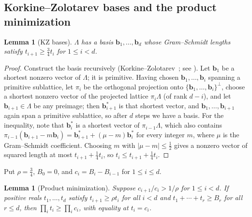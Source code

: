 \documentclass[11pt]{article}
\newtheorem{lemma}[theorem]{Lemma}
\theoremstyle{definition}
\theoremstyle{remark}
\newcommand{\vct}[1]{\mathbf{#1}}
\begin{document}
\subsection{Korkine--Zolotarev bases and the product minimization}

\begin{lemma}[KZ bases]\label{lem:kz}
$\Lambda$ has a basis $\vct{b}_1,\ldots,\vct{b}_d$ whose Gram--Schmidt
lengths satisfy $t_{i+1}\geq\frac34t_i$ for $1\leq i<d$.
\end{lemma}

\begin{proof}
Construct the basis recursively (Korkine--Zolotarev~\cite{KZ1873}; see
\cite{LLS90}).  Let $\vct{b}_1$ be a shortest nonzero vector of $\Lambda$;
it is primitive.  Having chosen $\vct{b}_1,\ldots,\vct{b}_i$ spanning a
primitive sublattice, let $\pi_i$ be the orthogonal projection onto
$\{\vct{b}_1,\ldots,\vct{b}_i\}^{\perp}$, choose a shortest nonzero vector
of the projected lattice $\pi_i\Lambda$ (of rank $d-i$), and let
$\vct{b}_{i+1}\in\Lambda$ be any preimage; then $\vct{b}_{i+1}^{*}$ is that
shortest vector, and $\vct{b}_1,\ldots,\vct{b}_{i+1}$ again span a
primitive sublattice, so after $d$ steps we have a basis.  For the
inequality, note that $\vct{b}_i^{*}$ is a shortest vector of
$\pi_{i-1}\Lambda$, which also contains
$\pi_{i-1}(\vct{b}_{i+1}-m\vct{b}_i)=\vct{b}_{i+1}^{*}+(\mu-m)\vct{b}_i^{*}$
for every integer $m$, where $\mu$ is the Gram--Schmidt coefficient.
Choosing $m$ with $|\mu-m|\leq\frac12$ gives a nonzero vector of squared
length at most $t_{i+1}+\frac14t_i$, so $t_i\leq t_{i+1}+\frac14t_i$.
\end{proof}

Put $\rho=\frac34$, $B_0=0$, and $c_i=B_i-B_{i-1}$ for $1\leq i\leq d$.

\begin{lemma}[Product minimization]\label{lem:minimize}
Suppose $c_{i+1}/c_i>1/\rho$ for $1\leq i<d$.  If positive reals
$t_1,\ldots,t_d$ satisfy $t_{i+1}\geq\rho t_i$ for all $i<d$ and
$t_1+\cdots+t_r\geq B_r$ for all $r\leq d$, then
$\prod_it_i\geq\prod_ic_i$, with equality at $t_i=c_i$.
\end{lemma}
\end{document}
